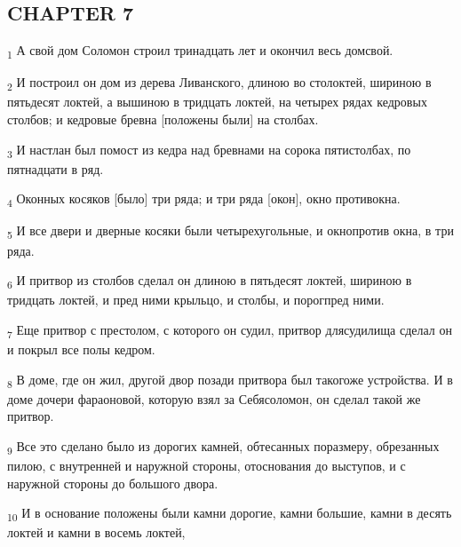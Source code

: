 \subsection{CHAPTER 7}
\begin{tcolorbox}
\textsubscript{1} А свой дом Соломон строил тринадцать лет и окончил весь домсвой.
\end{tcolorbox}
\begin{tcolorbox}
\textsubscript{2} И построил он дом из дерева Ливанского, длиною во столоктей, шириною в пятьдесят локтей, а вышиною в тридцать локтей, на четырех рядах кедровых столбов; и кедровые бревна [положены были] на столбах.
\end{tcolorbox}
\begin{tcolorbox}
\textsubscript{3} И настлан был помост из кедра над бревнами на сорока пятистолбах, по пятнадцати в ряд.
\end{tcolorbox}
\begin{tcolorbox}
\textsubscript{4} Оконных косяков [было] три ряда; и три ряда [окон], окно противокна.
\end{tcolorbox}
\begin{tcolorbox}
\textsubscript{5} И все двери и дверные косяки были четырехугольные, и окнопротив окна, в три ряда.
\end{tcolorbox}
\begin{tcolorbox}
\textsubscript{6} И притвор из столбов сделал он длиною в пятьдесят локтей, шириною в тридцать локтей, и пред ними крыльцо, и столбы, и порогпред ними.
\end{tcolorbox}
\begin{tcolorbox}
\textsubscript{7} Еще притвор с престолом, с которого он судил, притвор длясудилища сделал он и покрыл все полы кедром.
\end{tcolorbox}
\begin{tcolorbox}
\textsubscript{8} В доме, где он жил, другой двор позади притвора был такогоже устройства. И в доме дочери фараоновой, которую взял за Себясоломон, он сделал такой же притвор.
\end{tcolorbox}
\begin{tcolorbox}
\textsubscript{9} Все это сделано было из дорогих камней, обтесанных поразмеру, обрезанных пилою, с внутренней и наружной стороны, отоснования до выступов, и с наружной стороны до большого двора.
\end{tcolorbox}
\begin{tcolorbox}
\textsubscript{10} И в основание положены были камни дорогие, камни большие, камни в десять локтей и камни в восемь локтей,
\end{tcolorbox}
